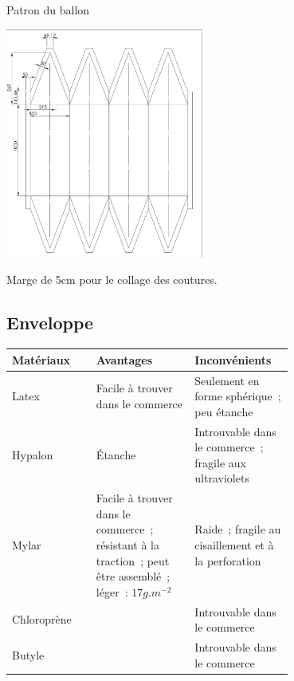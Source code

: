 \begin{frame}{Patron du ballon}
  \begin{center}
    \includegraphics[width=6.5cm, angle=270]{../Images/plan_ballon.png}
  \end{center}
  Marge de 5cm pour le collage des coutures.
\end{frame}

\subsection{Enveloppe}

\begin{frame}
	\begin{tabular}{|l|p{0.35\linewidth}|p{0.35\linewidth}|}
		\hline
		Matériaux & Avantages & Inconvénients \\
		\hline

		\rowcolor{OrangeT}
		Latex &
		Facile à trouver dans le commerce &
		Seulement en forme sphérique~; peu étanche \\
		\hline

		\rowcolor{RedT}
		Hypalon & Étanche & Introuvable dans le commerce~; fragile aux ultraviolets \\
		\hline

		\rowcolor{GreenT}
		Mylar &
		Facile à trouver dans le commerce~; résistant à la traction~; peut être assemblé~; léger~: $17 g.m^{-2}$ &
		Raide~; fragile au cisaillement et à la perforation \\
		\hline

		\rowcolor{RedT}
		Chloroprène &
		& Introuvable dans le commerce \\
		\hline

		\rowcolor{RedT}
		Butyle &
		& Introuvable dans le commerce \\
		\hline
	\end{tabular}
\end{frame}

